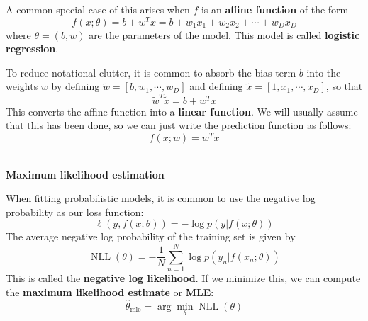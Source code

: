 A common special case of this arises when $f$ is an \textbf{affine function} of the form
\begin{equation}
f(x;\theta) = b + w^Tx = b + w_1x_1 + w_2x_2 + \cdots + w_Dx_D
\end{equation}
where $\theta = (b,w)$ are the parameters of the model. This model is called \textbf{logistic regression}.
\par
To reduce notational clutter, it is common to absorb the bias term $b$ into the weights $w$ by defining $\widetilde{w} = [b, w_1, \cdots, w_D]$ and defining $\widetilde{x} = [1, x_1,\cdots, x_D]$, so that
\begin{equation}
\widetilde{w}^T\widetilde{x} = b+w^Tx
\end{equation}
This converts the affine function into a \textbf{linear function}. We will usually assume that this has been done, so we can just write the prediction function as follows:
\begin{equation}
f(x;w) = w^Tx
\end{equation}
~\\
\par
\noindent
\textbf{Maximum likelihood estimation}
\par
When fitting probabilistic models, it is common to use the negative log probability as our loss function:
\begin{equation}
\ell(y, f(x;\theta)) = -\log p(y|f(x;\theta))
\end{equation}
The average negative log probability of the training set is given by
\begin{equation}
\operatorname{NLL}(\theta) = -\frac{1}{N}\sum_{n=1}^N\log p(y_n|f(x_n;\theta))
\end{equation}
This is called the \textbf{negative log likelihood}. If we minimize this, we can compute the \textbf{maximum likelihood estimate} or \textbf{MLE}:
\begin{equation}
\hat{\theta}_{\operatorname{mle}} = \arg\min_{\theta}\operatorname{NLL}(\theta)
\end{equation}
